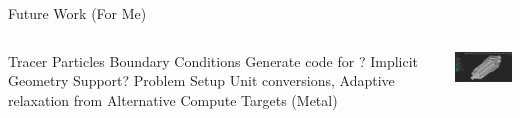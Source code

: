 \begin{frame}{Future Work (For Me)}
\begin{columns}
  \begin{outline}
  \1 Tracer Particles
  \1 Boundary Conditions 
  \2 Generate code for \cite{Lyu2021}?
  \2 Implicit Geometry Support?
  \1 Problem Setup
  \2 Unit conversions, 
  \2 Adaptive relaxation from \cite{Li2020}
  \1 Alternative Compute Targets (Metal)
  \end{outline}

\centering
\begin{center}
  \includegraphics[width=4cm]{ntop.jpg}
\end{center}
\end{columns}
\begin{center}
\end{center}

\end{frame}
